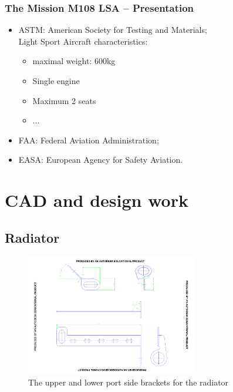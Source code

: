 \documentclass{beamer}
\begin{document}
\begin{frame}\frametitle{The Mission M108 LSA -- Presentation}
  \begin{itemize}
    \item ASTM: American Society for Testing and Materials;\\
Light Sport Aircraft characteristics:
\begin{itemize}
\item maximal weight: 600kg
\item Single engine
\item Maximum 2 seats
\item ...
\end{itemize}
    \item FAA: Federal Aviation Administration;
    \item EASA: European Agency for Safety Aviation.
  \end{itemize}
\end{frame}

\section{CAD and design work}
\subsection{Radiator}

\begin{frame}
\begin{figure}[ht!]
	\begin{center}
		\includegraphics[width=7.5cm,trim = 2cm 1cm 2cm 1cm, clip]{pics/PIC007.pdf}
		\caption{The upper and lower port side brackets for the radiator}
		\label{fig:PIC007}
	\end{center}
\end{figure}
\end{frame}
\end{document}
